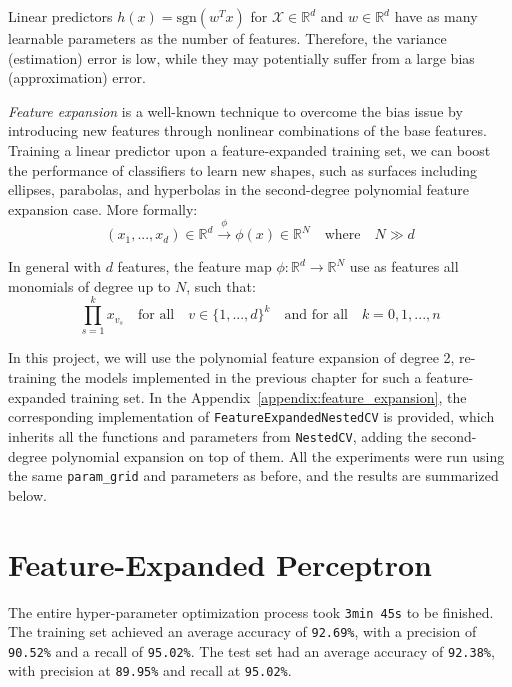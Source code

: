 
Linear predictors $h(x) = \text{sgn}(w^Tx)$ for $\mathcal{X} \in \mathbb{R}^d$ and $w \in \mathbb{R}^d$ have as many learnable parameters as the number of features. Therefore, the variance (estimation) error is low, while they may potentially suffer from a large bias (approximation) error.

\textit{Feature expansion} is a well-known technique to overcome the bias issue by introducing new features through nonlinear combinations of the base features. Training a linear predictor upon a feature-expanded training set, we can boost the performance of classifiers to learn new shapes, such as surfaces including ellipses, parabolas, and hyperbolas in the second-degree polynomial feature expansion case. More formally:
\begin{equation}
    (x_1, ..., x_d) \in \mathbb{R}^d \xrightarrow{\phi} \phi(x) \in \mathbb{R}^N  \quad \text{where} \quad N \gg d
\end{equation}

In general with $d$ features, the feature map $\phi: \mathbb{R}^d \rightarrow \mathbb{R}^N$ use as features all monomials of degree up to $N$, such that:
\begin{equation}
    \prod_{s=1}^{k} x_{v_s} \quad \text{for all} \quad v \in \{1, ..., d\}^k \quad \text{and for all} \quad k = 0, 1, ..., n
\end{equation}

In this project, we will use the polynomial feature expansion of degree 2, re-training the models implemented in the previous chapter for such a feature-expanded training set. In the Appendix~\ref{appendix:feature_expansion}, the corresponding implementation of \texttt{FeatureExpandedNestedCV} is provided, which inherits all the functions and parameters from \texttt{NestedCV}, adding the second-degree polynomial expansion on top of them. All the experiments were run using the same \texttt{param\_grid} and parameters as before, and the results are summarized below.


\section{Feature-Expanded Perceptron}

The entire hyper-parameter optimization process took \texttt{3min 45s} to be finished. The training set achieved an average accuracy of \texttt{92.69\%}, with a precision of \texttt{90.52\%} and a recall of \texttt{95.02\%}. The test set had an average accuracy of \texttt{92.38\%}, with precision at \texttt{89.95\%} and recall at \texttt{95.02\%}.

